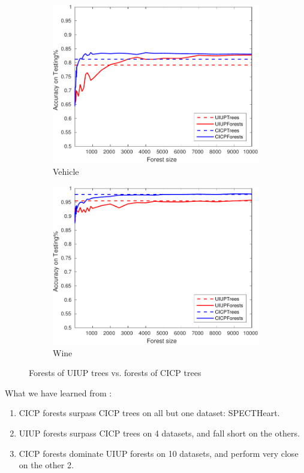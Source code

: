 \begin{figure}[ht]
\begin{subfigure}[b]{0.3\textwidth}
  	\includegraphics[width=\textwidth]{figs/PLPTF/Forests/VehicleDownsampledFurther_Forests_MH.pdf}
  	\caption{Vehicle}
		\label{fig:V4}
	\end{subfigure}
  \begin{subfigure}[b]{0.3\textwidth}
		\centering
  	\includegraphics[width=\textwidth]{figs/PLPTF/Forests/WineDownsampled_Forests_MH.pdf}
  	\caption{Wine}
		\label{fig:W4}
	\end{subfigure}

  \caption{Forests of UIUP trees vs. forests of CICP trees}
  \label{fig:forests2}
\end{figure}

What we have learned from :
\begin{enumerate}
	\item CICP forests surpass CICP trees on all but one dataset: SPECTHeart.
	\item UIUP forests surpass CICP trees on 4 datasets, and fall short on the others.
	\item CICP forests dominate UIUP forests on 10 datasets, and perform very close on
				the other 2.
\end{enumerate}


